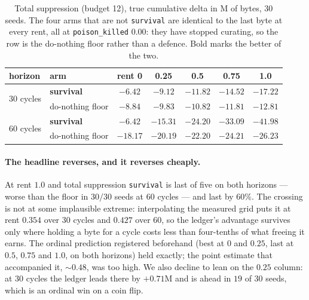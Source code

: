 \begin{table}[t]
\centering
\tabsize
\caption{Total suppression (budget 12), true cumulative delta in M of
bytes, 30 seeds. The four arms that are not \texttt{survival} are
identical to the last byte at every rent, all at \texttt{poison\_killed}
$0.00$: they have stopped curating, so the row is the do-nothing floor
rather than a defence. Bold marks the better of the two.}
\label{tab:rent}
\begin{tabular}{llccccc}
\toprule
horizon & arm & rent 0 & 0.25 & 0.5 & 0.75 & 1.0 \\
\midrule
\multirow{2}{*}{30 cycles}
 & \textbf{survival} & $\mathbf{-6.42}$ & $\mathbf{-9.12}$ & $-11.82$ & $-14.52$ & $-17.22$ \\
 & do-nothing floor  & $-8.84$ & $-9.83$ & $\mathbf{-10.82}$ & $\mathbf{-11.81}$ & $\mathbf{-12.81}$ \\
\midrule
\multirow{2}{*}{60 cycles}
 & \textbf{survival} & $\mathbf{-6.42}$ & $\mathbf{-15.31}$ & $-24.20$ & $-33.09$ & $-41.98$ \\
 & do-nothing floor  & $-18.17$ & $-20.19$ & $\mathbf{-22.20}$ & $\mathbf{-24.21}$ & $\mathbf{-26.23}$ \\
\bottomrule
\end{tabular}
\end{table}

\paragraph{The headline reverses, and it reverses cheaply.} At rent
$1.0$ and total suppression \texttt{survival} is last of five on both
horizons --- worse than the floor in $30/30$ seeds at 60 cycles --- and
last by $60\%$. The crossing is not at some implausible extreme:
interpolating the measured grid puts it at rent $0.354$ over 30 cycles
and $0.427$ over 60, so the ledger's advantage survives only where
holding a byte for a cycle costs less than four-tenths of what freeing
it earns. The ordinal prediction registered beforehand (best at $0$ and
$0.25$, last at $0.5$, $0.75$ and $1.0$, on both horizons) held exactly;
the point estimate that accompanied it, $\sim\!0.48$, was too high. We
also decline to lean on the $0.25$ column: at 30 cycles the ledger leads
there by $+0.71$M and is ahead in $19$ of $30$ seeds, which is an
ordinal win on a coin flip.

